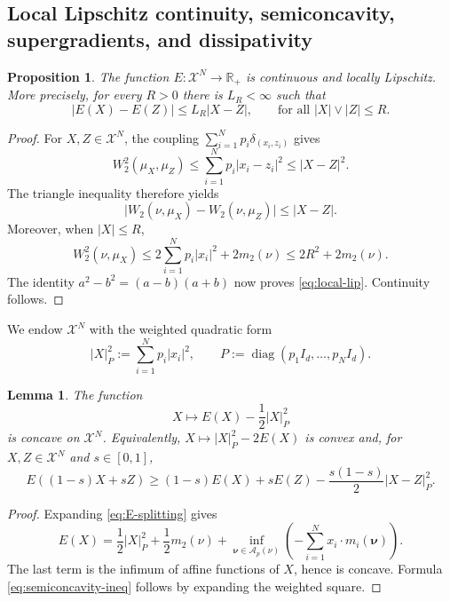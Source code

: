 \documentclass[11pt]{article}
\def\R{\mathbb{R}}
\def\Ac{{\mathcal A}}
\def\Xc{{\mathcal X}}
\newcommand{\Wtwo}{W_2}
\newtheorem{lemma}[theorem]{Lemma}
\newtheorem{proposition}[theorem]{Proposition}
\theoremstyle{definition}
\theoremstyle{remark}
\numberwithin{equation}{section}
\begin{document}
\subsection{Local Lipschitz continuity, semiconcavity, supergradients, and dissipativity}

\begin{proposition}\label{prop:lip}
The function $E:\Xc^N\to \R_+$ is continuous and locally Lipschitz.  More precisely, for
every $R>0$ there is $L_R<\infty$ such that
\begin{equation}\label{eq:local-lip}
 |E(X)-E(Z)|\le L_R|X-Z|,
 \qquad\text{for all } |X|\vee|Z|\le R.
\end{equation}
\end{proposition}

\begin{proof}
For $X,Z\in\Xc^N$, the coupling
$\sum_{i=1}^Np_i\delta_{(x_i,z_i)}$ gives
\begin{equation}\label{eq:atomic-coupling-bound}
 \Wtwo^2(\mu_X,\mu_Z)\le\sum_{i=1}^Np_i|x_i-z_i|^2\le|X-Z|^2.
\end{equation}
The triangle inequality therefore yields
\[
 \big|\Wtwo(\nu,\mu_X)-\Wtwo(\nu,\mu_Z)\big|\le|X-Z|.
\]
Moreover, when $|X|\le R$,
\[
 \Wtwo^2(\nu,\mu_X)
 \le 2\sum_{i=1}^Np_i|x_i|^2+2m_2(\nu)
 \le2R^2+2m_2(\nu).
\]
The identity $a^2-b^2=(a-b)(a+b)$ now proves \eqref{eq:local-lip}.  Continuity follows.
\end{proof}


We endow
$\Xc^N$ with the weighted quadratic form
\begin{equation}\label{eq:P-norm}
 |X|_P^2:=\sum_{i=1}^Np_i|x_i|^2,
 \qquad
 P:=\operatorname{diag}(p_1I_d,\ldots,p_NI_d).
\end{equation}

\begin{lemma}\label{lem:DC}
The function
\begin{equation}\label{eq:concave-part}
 X\longmapsto E(X)-\frac12|X|_P^2
\end{equation}
is concave on $\Xc^N$.  Equivalently,
$X\mapsto |X|_P^2-2E(X)$ is convex and, for $X,Z\in\Xc^N$ and $s\in[0,1]$,
\begin{equation}\label{eq:semiconcavity-ineq}
 E((1-s)X+sZ)
 \ge(1-s)E(X)+sE(Z)-\frac{s(1-s)}2|X-Z|_P^2.
\end{equation}
\end{lemma}

\begin{proof}
Expanding \eqref{eq:E-splitting} gives
\begin{equation}\label{eq:semiconcavity-representation}
 E(X)=\frac12|X|_P^2+\frac12m_2(\nu)
 +\inf_{\boldsymbol\nu\in\Ac_p(\nu)}
 \left(-\sum_{i=1}^Nx_i\cdot m_i(\boldsymbol\nu)\right).
\end{equation}
The last term is the infimum of affine functions of $X$, hence is concave.  Formula
\eqref{eq:semiconcavity-ineq} follows by expanding the weighted square.
\end{proof}
\end{document}
